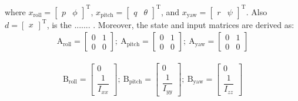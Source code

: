\documentclass[conference]{IEEEtran}
\begin{document}
where $x_{\text{roll}} = \begin{bmatrix}
	p & \phi
\end{bmatrix}^\mathrm{T}$, $x_{\text{pitch}} = \begin{bmatrix}
	q & \theta \end{bmatrix}^\mathrm{T}$, and $x_{\text{yaw}} = \begin{bmatrix}
	r & \psi
\end{bmatrix}^\mathrm{T}$.
Also $d = \begin{bmatrix}
	x
\end{bmatrix}^\mathrm{T}$, is the ....... .
Moreover, the state and input matrices are derived as:
\begin{equation}
	\begin{split}
		\boldsymbol{\mathrm{A}}_{\text{roll}}  = \begin{bmatrix}
			0 & 1
			\\
			0 & 0
		\end{bmatrix};~ \boldsymbol{\mathrm{A}}_{\text{pitch}}  = \begin{bmatrix}
			0 & 1\\
			0 & 0
		\end{bmatrix};~ \boldsymbol{\mathrm{A}}_{\text{yaw}}  = \begin{bmatrix}
			0 & 1\\
			0 & 0
		\end{bmatrix}
	\end{split}
\end{equation}

\begin{equation}
	\begin{split}
		\boldsymbol{\mathrm{B}}_{\text{roll}}  = \begin{bmatrix}
			0
			\\[1em]
			\dfrac{1}{I_{xx}}
		\end{bmatrix};~ \boldsymbol{\mathrm{B}}_{\text{pitch}}  = \begin{bmatrix}
			0
			\\[1em]
			\dfrac{1}{I_{yy}}
		\end{bmatrix};~ \boldsymbol{\mathrm{B}}_{\text{yaw}}  = \begin{bmatrix}
			0
			\\[1em]
			\dfrac{1}{I_{zz}}
		\end{bmatrix}
	\end{split}
\end{equation}
\end{document}

